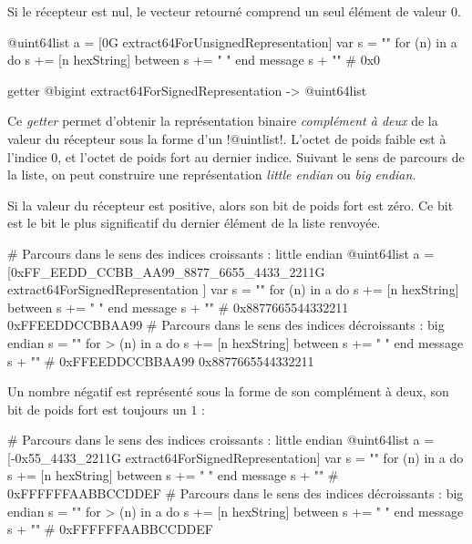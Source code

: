 Si le récepteur est nul, le vecteur retourné comprend un seul élément de valeur $0$.

\begin{galgas}
@uint64list a = [0G extract64ForUnsignedRepresentation]
var s = ""
for (n) in a
  do s += [n hexString]
  between s += " "
end
message s + "\n" # 0x0
\end{galgas}





\begin{galgas}
getter @bigint extract64ForSignedRepresentation -> @uint64list
\end{galgas}

Ce \emph{getter} permet d'obtenir la représentation binaire \emph{complément à deux} de la valeur du récepteur sous la forme d'un \ggs!@uintlist!. L'octet de poids faible est à l'indice $0$, et l'octet de poids fort au dernier indice. Suivant le sens de parcours de la liste, on peut construire une représentation \emph{little endian} ou \emph{big endian}.

Si la valeur du récepteur est positive, alors son bit de poids fort est zéro. Ce bit est le bit le plus significatif du dernier élément de la liste renvoyée.

\begin{galgas}
# Parcours dans le sens des indices croissants : little endian
@uint64list a = [0xFF_EEDD_CCBB_AA99_8877_6655_4433_2211G
  extract64ForSignedRepresentation
]
var s = ""
for (n) in a
  do s += [n hexString]
  between s += " "
end
message s + "\n" # 0x8877665544332211 0xFFEEDDCCBBAA99
# Parcours dans le sens des indices décroissants : big endian
s = ""
for > (n) in a
  do s += [n hexString]
  between s += " "
end
message s + "\n" # 0xFFEEDDCCBBAA99 0x8877665544332211
\end{galgas}

Un nombre négatif est représenté sous la forme de son complément à deux, son bit de poids fort est toujours un $1$ : 

\begin{galgas}
# Parcours dans le sens des indices croissants : little endian
@uint64list a = [-0x55_4433_2211G extract64ForSignedRepresentation]
var s = ""
for (n) in a
  do s += [n hexString]
  between s += " "
end
message s + "\n" # 0xFFFFFFAABBCCDDEF
# Parcours dans le sens des indices décroissants : big endian
s = ""
for > (n) in a
  do s += [n hexString]
  between s += " "
end
message s + "\n" # 0xFFFFFFAABBCCDDEF
\end{galgas}














